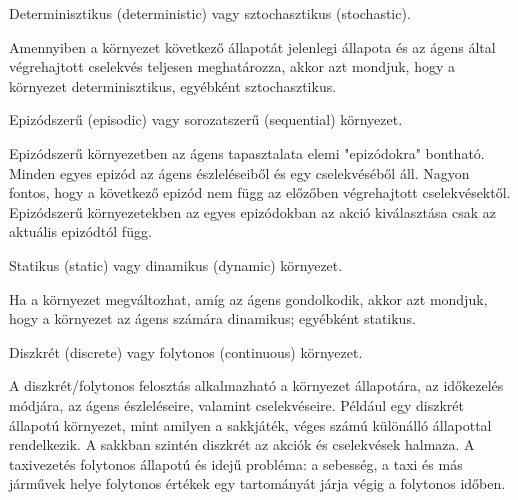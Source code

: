 \begin{definicio}
    Determinisztikus (deterministic) vagy sztochasztikus (stochastic).

    Amennyiben a környezet következő állapotát jelenlegi állapota és az ágens
    által végrehajtott cselekvés teljesen meghatározza, akkor azt mondjuk, hogy
    a környezet determinisztikus, egyébként sztochasztikus.
\end{definicio}

\begin{definicio}
    Epizódszerű (episodic) vagy sorozatszerű (sequential) környezet.

    Epizódszerű környezetben az ágens tapasztalata elemi "epizódokra" bontható.
    Minden egyes epizód az ágens észleléseiből és egy cselekvéséből áll. Nagyon
    fontos, hogy a következő epizód nem függ az előzőben végrehajtott
    cselekvésektől.  Epizódszerű környezetekben az egyes epizódokban az akció
    kiválasztása csak az aktuális epizódtól függ.
\end{definicio}

\begin{definicio}
    Statikus (static) vagy dinamikus (dynamic) környezet.

    Ha a környezet megváltozhat, amíg az ágens gondolkodik, akkor azt mondjuk,
    hogy a környezet az ágens számára dinamikus; egyébként statikus.
\end{definicio}

\begin{definicio}
    Diszkrét (discrete) vagy folytonos (continuous) környezet.

    A diszkrét/folytonos felosztás alkalmazható a környezet állapotára, az
    időkezelés módjára, az ágens észleléseire, valamint cselekvéseire. Például
    egy diszkrét állapotú környezet, mint amilyen a sakkjáték, véges számú
    különálló állapottal rendelkezik. A sakkban szintén diszkrét az akciók és
    cselekvések halmaza. A taxivezetés folytonos állapotú és idejű probléma: a
    sebesség, a taxi és más járművek helye folytonos értékek egy tartományát
    járja végig a folytonos időben.
\end{definicio}

